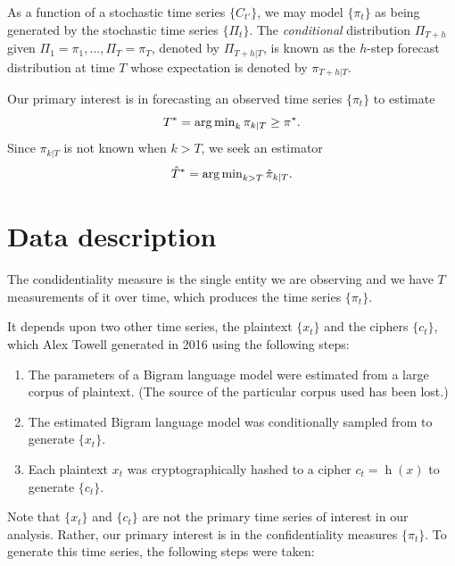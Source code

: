 \documentclass[final,
  11pt,
]{article}
\begin{document}
As a function of a stochastic time series \(\{C_{t'}\}\), we may
model \(\{\pi_t\}\) as being generated by the stochastic time series
\(\{\Pi_t\}\). The \emph{conditional} distribution $\Pi_{T+h}$
given $\Pi_1 = \pi_1,\ldots,\Pi_T = \pi_T$, denoted by \(\Pi_{T+h|T}\),
is known as the \(h\)-step forecast distribution at time \(T\) whose
expectation is denoted by $\pi_{T+h|T}$.

Our primary interest is in forecasting an observed time series
\(\{\pi_t\}\) to estimate
\[
    T^* = \operatorname{arg\,min}_{k} \pi_{k|T} \geq \pi^*.
\]
Since \(\pi_{k|T}\) is not known when $k>T$, we seek an estimator
\[
    \hat{T}^* = \operatorname{arg\,min}_{k>T} \hat{\pi}_{k|T}.
\]

\hypertarget{data-description}{%
\section{Data description}\label{data-description}}

The condidentiality measure is the single entity we are observing and
we have \(T\) measurements of it over time, which produces the
time series \(\{\pi_t\}\).

It depends upon two other time series, the plaintext \(\{x_t\}\)
and the ciphers \(\{c_t\}\), which Alex Towell generated in 2016
using the following steps:

\begin{enumerate}
\item The parameters of a Bigram language model were estimated from a large
corpus of plaintext.
(The source of the particular corpus used has been lost.)
\item The estimated Bigram language model was conditionally sampled from to
generate $\{x_t\}$.
\item Each plaintext $x_t$ was cryptographically hashed to a cipher
$c_t = \operatorname{h}(x)$ to generate $\{c_t\}$.
\end{enumerate}

Note that \(\{x_t\}\) and \(\{c_t\}\) are not the primary time series of
interest in our analysis. Rather, our primary interest is in the
confidentiality measures \(\{\pi_t\}\). To generate this time series,
the following steps were taken:
\end{document}
